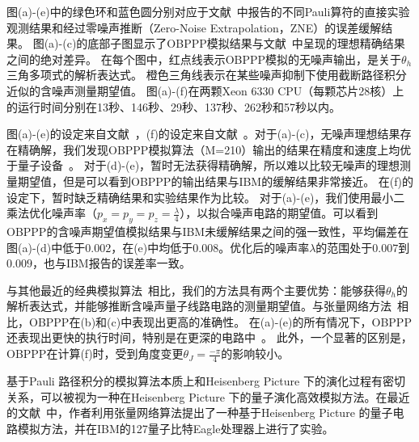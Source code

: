 图(a)-(e)中的绿色环和蓝色圆分别对应于文献~\cite{kim2023evidence}中报告的不同Pauli算符的直接实验观测结果和经过零噪声推断（Zero-Noise Extrapolation，ZNE）的误差缓解结果。
图(a)-(c)的底部子图显示了OBPPP模拟结果与文献~\cite{kim2023evidence}中呈现的理想精确结果之间的绝对差异。
在每个图中，红点线表示OBPPP模拟的无噪声输出，是关于$\theta_h$三角多项式的解析表达式。
橙色三角线表示在某些噪声抑制下使用截断路径积分近似的含噪声测量期望值。
图(a)-(f)在两颗Xeon 6330 CPU（每颗芯片28核）上的运行时间分别在13秒、146秒、29秒、137秒、262秒和57秒以内。

图(a)-(e)的设定来自文献~\cite{kim2023evidence}，(f)的设定来自文献~\cite{anand2023classical}。对于(a)-(c)，无噪声理想结果存在精确解，我们发现OBPPP模拟算法（M=210）输出的结果在精度和速度上均优于量子设备~\cite{beguvsic2023fast, kim2023evidence}。
对于(d)-(e)，暂时无法获得精确解，所以难以比较无噪声的理想测量期望值，但是可以看到OBPPP的输出结果与IBM的缓解结果非常接近。
在(f)的设定下，暂时缺乏精确结果和实验结果作为比较。
对于(a)-(e)，我们使用最小二乘法优化噪声率（$p_x=p_y=p_z=\frac{\lambda}{4}$），以拟合噪声电路的期望值。可以看到OBPPP的含噪声期望值模拟结果与IBM未缓解结果之间的强一致性，平均偏差在图(a)-(d)中低于$0.002$，在(e)中均低于$0.008$。优化后的噪声率$\lambda$的范围处于$0.007$到$0.009$，也与IBM报告的误差率一致。



与其他最近的经典模拟算法~\cite{tindall2023efficient,beguvsic2023fast}相比，我们的方法具有两个主要优势：能够获得$\theta_h$的解析表达式，并能够推断含噪声量子线路电路的测量期望值。与张量网络方法~\cite{tindall2023efficient}相比，OBPPP在(b)和(c)中表现出更高的准确性。
在(a)-(e)的所有情况下，OBPPP还表现出更快的执行时间，特别是在更深的电路中~\cite{tindall2023efficient}。
此外，一个显著的区别是，OBPPP在计算(f)时，受到角度变更$\theta_J=\frac{-\pi}{4}$的影响较小。


基于Pauli 路径积分的模拟算法本质上和Heisenberg Picture 下的演化过程有密切关系，可以被视为一种在Heisenberg Picture 下的量子演化高效模拟方法。在最近的文献~\cite{liao2023simulation}中，作者利用张量网络算法提出了一种基于Heisenberg Picture 的量子电路模拟方法，并在IBM的127量子比特Eagle处理器上进行了实验。

